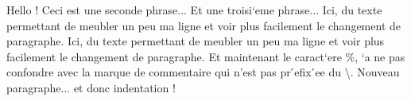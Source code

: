 \documentclass{article}
\begin{document}
Hello !
Ceci est une seconde phrase...
Et une troisi`eme
phrase...
Ici, du texte permettant de meubler un peu ma ligne et voir plus
facilement le changement de paragraphe.
Ici, du texte permettant de meubler un peu ma ligne et voir plus
facilement le changement de paragraphe.
Et maintenant le caract`ere \%, `a ne pas %
confondre avec la marque de commentaire qui n'est pas pr ́efix ́ee du
\textbackslash.
Nouveau paragraphe... et donc indentation !
\end{document}
